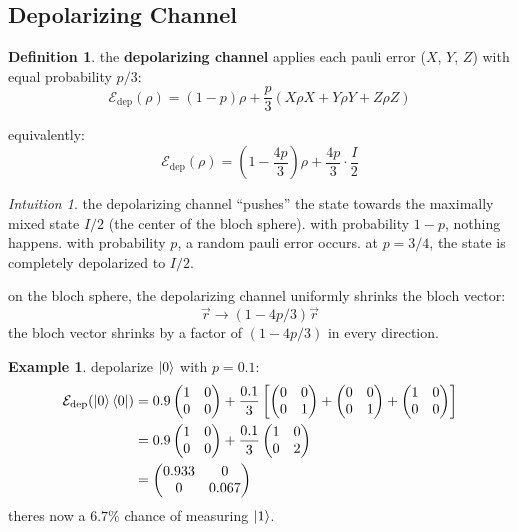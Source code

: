 \documentclass[11pt,a4paper]{article}
\theoremstyle{definition}
\newtheorem{definition}{Definition}[section]
\newtheorem{example}{Example}[section]
\theoremstyle{remark}
\newtheorem*{intuition}{Intuition}
\begin{document}
\subsection{Depolarizing Channel}

\begin{definition}
the \textbf{depolarizing channel} applies each pauli error ($X$, $Y$, $Z$) with equal probability $p/3$:
\[
\boxed{\mathcal{E}_{\text{dep}}(\rho) = (1-p)\rho + \frac{p}{3}(X\rho X + Y\rho Y + Z\rho Z)}
\]
\end{definition}

equivalently:
\[
\mathcal{E}_{\text{dep}}(\rho) = \left(1 - \frac{4p}{3}\right)\rho + \frac{4p}{3} \cdot \frac{I}{2}
\]

\begin{intuition}
the depolarizing channel ``pushes'' the state towards the maximally mixed state $I/2$ (the center of the bloch sphere). with probability $1-p$, nothing happens. with probability $p$, a random pauli error occurs. at $p = 3/4$, the state is completely depolarized to $I/2$.

on the bloch sphere, the depolarizing channel uniformly shrinks the bloch vector:
\[
\vec{r} \to (1 - 4p/3)\vec{r}
\]
the bloch vector shrinks by a factor of $(1-4p/3)$ in every direction.
\end{intuition}

\begin{example}
depolarize $\ket{0}$ with $p = 0.1$:
\begin{align}
\mathcal{E}_{\text{dep}}(\ket{0}\bra{0}) &= 0.9\begin{pmatrix} 1 & 0 \\ 0 & 0 \end{pmatrix} + \frac{0.1}{3}\left[\begin{pmatrix} 0 & 0 \\ 0 & 1 \end{pmatrix} + \begin{pmatrix} 0 & 0 \\ 0 & 1 \end{pmatrix} + \begin{pmatrix} 1 & 0 \\ 0 & 0 \end{pmatrix}\right] \\
&= 0.9\begin{pmatrix} 1 & 0 \\ 0 & 0 \end{pmatrix} + \frac{0.1}{3}\begin{pmatrix} 1 & 0 \\ 0 & 2 \end{pmatrix} \\
&= \begin{pmatrix} 0.933 & 0 \\ 0 & 0.067 \end{pmatrix}
\end{align}
theres now a $6.7\%$ chance of measuring $\ket{1}$.
\end{example}
\end{document}
